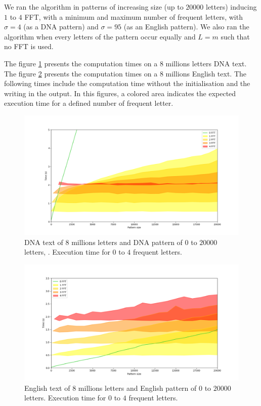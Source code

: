 \documentclass[preprint,12pt]{elsarticle}
\begin{document}
We ran the algorithm in patterns of increasing size (up to $20 000$ letters) inducing $1$ to $4$ FFT,
with a minimum and maximum number of frequent letters, with $\sigma = 4$ (as a DNA pattern)
and $\sigma = 95$ (as an English pattern).
We also ran the algorithm when every letters of the pattern occur equally and $L=m$ such that no FFT is used.

The figure \ref{ExHDADN} presents the computation times on a $8$ millions letters DNA text.
The figure \ref{ExHDEnglish} presents the computation times on a $8$ millions English text.
The following times include the computation time without the initialisation and the writing in the output.
In this figures, a colored area indicates the expected execution time for a defined number of frequent letter.

\begin{figure}[h]
\includegraphics[scale=0.45]{./figures/ExHDADN.png}
\caption{DNA text of $8$ millions letters and DNA pattern of $0$ to $20 000$ letters, .
Execution time for $0$ to $4$ frequent letters.}
\label{ExHDADN}
\end{figure}

\begin{figure}[h]
\includegraphics[scale=0.45]{./figures/ExHDEnglish.png}
\caption{English text of $8$ millions letters and English pattern of $0$ to $20 000$ letters.
Execution time for $0$ to $4$ frequent letters.}
\label{ExHDEnglish}
\end{figure}
\end{document}
